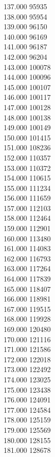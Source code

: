 { 137.000	95935 \\
 138.000	95954 \\
 139.000	96150 \\
 140.000	96169 \\
 141.000	96187 \\
 142.000	96204 \\
 143.000	100078 \\
 144.000	100096 \\
 145.000	100107 \\
 146.000	100117 \\
 147.000	100128 \\
 148.000	100138 \\
 149.000	100149 \\
 150.000	101415 \\
 151.000	108236 \\
 152.000	110357 \\
 153.000	110372 \\
 154.000	110615 \\
 155.000	111234 \\
 156.000	111659 \\
 157.000	112103 \\
 158.000	112464 \\
 159.000	112901 \\
 160.000	113480 \\
 161.000	114083 \\
 162.000	116793 \\
 163.000	117264 \\
 164.000	117839 \\
 165.000	118407 \\
 166.000	118981 \\
 167.000	119515 \\
 168.000	119928 \\
 169.000	120480 \\
 170.000	121116 \\
 171.000	121586 \\
 172.000	122018 \\
 173.000	122492 \\
 174.000	123025 \\
 175.000	123438 \\
 176.000	124091 \\
 177.000	124584 \\
 178.000	125159 \\
 179.000	125569 \\
 180.000	128155 \\
 181.000	128678 \\
}
